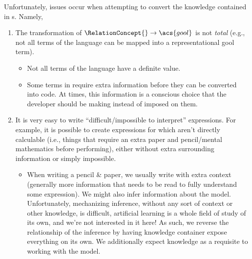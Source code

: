 
Unfortunately, issues occur when attempting to convert the knowledge contained
in \RelationConcept{}s. Namely,

\begin{enumerate}

	\item The transformation of \(\RelationConcept{} \rightarrow
	      \acs{gool}\) is not \textit{total} (e.g., not all terms of
	      the \Expr{} language can be mapped into a representational
	      \acs{gool} term).

	      \begin{itemize}

		      \item Not all terms of the \Expr{} language have a definite value.

		      \item Some terms in \Expr{} require extra information before they
		            can be converted into code. At times, this information is a
		            conscious choice that the developer should be making instead
		            of imposed on them.

	      \end{itemize}

	\item It is very easy to write ``difficult/impossible to interpret''
	      expressions. For example, it is possible to create expressions for
	      which aren't directly calculable (i.e., things that require an extra
	      paper and pencil/mental mathematics before performing), either without
	      extra surrounding information or simply impossible.

	      \begin{itemize}

		      \item When writing a pencil \& paper, we usually write with extra
		            context (generally more information that needs to be read to
		            fully understand some expression). We might also infer
		            information about the model. Unfortunately, mechanizing
		            inference, without any sort of context or other knowledge,
		            is difficult, artificial learning is a whole field of study
		            of its own, and we're not interested in it here! As such, we
		            reverse the relationship of the inference by having
		            knowledge container expose everything on its own. We
		            additionally expect knowledge as a requisite to working with
		            the model.


\end{itemize}
\end{enumerate}
